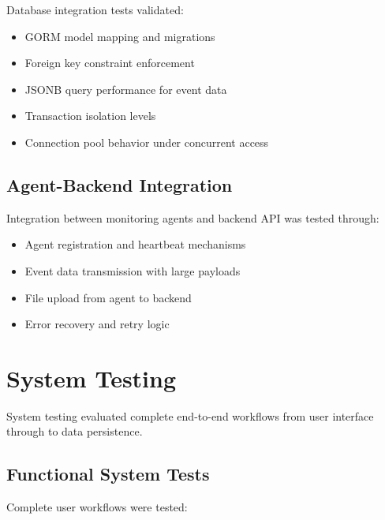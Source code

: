 Database integration tests validated:

\begin{itemize}
    \item GORM model mapping and migrations
    \item Foreign key constraint enforcement
    \item JSONB query performance for event data
    \item Transaction isolation levels
    \item Connection pool behavior under concurrent access
\end{itemize}

\subsection{Agent-Backend Integration}

Integration between monitoring agents and backend API was tested through:

\begin{itemize}
    \item Agent registration and heartbeat mechanisms
    \item Event data transmission with large payloads
    \item File upload from agent to backend
    \item Error recovery and retry logic
\end{itemize}

\section{System Testing}

System testing evaluated complete end-to-end workflows from user interface through to data persistence.

\subsection{Functional System Tests}

Complete user workflows were tested:

